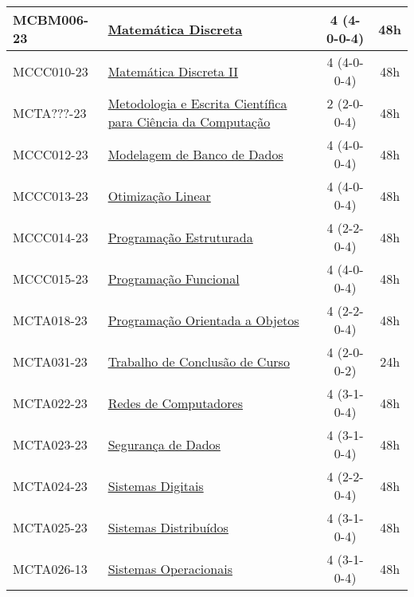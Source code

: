 \begin{table}[h!]
\begin{tabular}{|l|p{}|c|c|}
        MCBM006-23 & \hyperref[disc:mdI]{Matemática Discreta} & 4 (4-0-0-4) & 48h \\
        \hline
        MCCC010-23 & \hyperref[disc:mdII]{Matemática Discreta II} & 4 (4-0-0-4) & 48h \\
        \hline
        MCTA???-23 & \hyperref[disc:metod]{Metodologia e Escrita Científica para Ciência da Computação} & 2 (2-0-0-4) & 48h \\
        \hline
        MCCC012-23 & \hyperref[disc:mbd]{Modelagem de Banco de Dados} & 4 (4-0-0-4) & 48h \\
        \hline
        MCCC013-23 & \hyperref[disc:ol]{Otimização Linear} & 4 (4-0-0-4) & 48h \\
        \hline
        MCCC014-23 & \hyperref[disc:pe]{Programação Estruturada} & 4 (2-2-0-4) & 48h \\
        \hline
        MCCC015-23 & \hyperref[disc:pf]{Programação Funcional} & 4 (4-0-0-4) & 48h \\
        \hline
        MCTA018-23 & \hyperref[disc:poo]{Programação Orientada a Objetos} & 4 (2-2-0-4) & 48h \\
        \hline
        MCTA031-23 & \hyperref[disc:tccIII]{Trabalho de Conclusão de Curso} & 4 (2-0-0-2) & 24h \\
        \hline
        MCTA022-23 & \hyperref[disc:redes]{Redes de Computadores} & 4 (3-1-0-4) & 48h \\
        \hline
        MCTA023-23 & \hyperref[disc:seg]{Segurança de Dados} & 4 (3-1-0-4) & 48h \\
        \hline
        MCTA024-23 & \hyperref[disc:sist_dig]{Sistemas Digitais} & 4 (2-2-0-4) & 48h \\
        \hline
        MCTA025-23 & \hyperref[disc:sist_distr]{Sistemas Distribuídos} & 4 (3-1-0-4) & 48h \\
        \hline
        MCTA026-13 & \hyperref[disc:so]{Sistemas Operacionais} & 4 (3-1-0-4) & 48h\\
        \hline
    \end{tabular}
\end{table}

